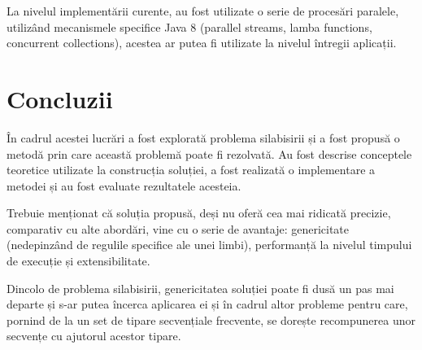 La nivelul implementării curente, au fost utilizate o serie de procesări paralele, utilizând mecanismele specifice Java 8 (parallel streams, lamba functions, concurrent collections), acestea ar putea fi utilizate la nivelul întregii aplicații. 


\chapter{Concluzii}
\label{cap:concluzii}

În cadrul acestei lucrări a fost explorată problema silabisirii și a fost propusă o metodă prin care această problemă poate fi rezolvată. Au fost descrise conceptele teoretice utilizate la construcția soluției, a fost realizată o implementare a metodei și au fost evaluate rezultatele acesteia. 

Trebuie menționat că soluția propusă, deși nu oferă cea mai ridicată precizie, comparativ cu alte abordări, vine cu o serie de avantaje: genericitate (nedepinzând de regulile specifice ale unei limbi), performanță la nivelul timpului de execuție și extensibilitate.

Dincolo de problema silabisirii, genericitatea soluției poate fi dusă un pas mai departe și s-ar putea încerca aplicarea ei și în cadrul altor probleme pentru care, pornind de la un set de tipare secvențiale frecvente, se dorește recompunerea unor secvențe cu ajutorul acestor tipare.